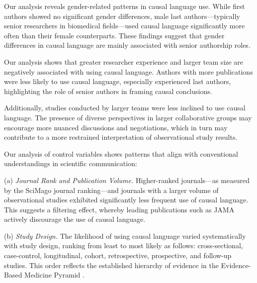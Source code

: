 Our analysis reveals gender-related patterns in causal language use.
While first authors showed no
significant gender differences, male last authors—typically senior researchers
in biomedical fields—used causal language significantly more often than
their female counterparts. These findings suggest that gender differences in
causal language are mainly associated with senior authorship roles.


Our analysis shows that greater researcher experience and larger team size are
negatively associated with using causal language. Authors with more publications
were less likely to use causal language, especially experienced last authors,
highlighting the role of senior authors in framing causal conclusions.

Additionally, studies conducted by larger teams were less inclined to use causal language.
The presence of diverse perspectives in larger collaborative groups
may encourage more nuanced discussions and negotiations, which in turn may contribute to a
more restrained interpretation of observational study results.


%
Our analysis of control variables shows patterns that align with conventional
understandings in scientific communication:

(a) {\em Journal Rank and Publication Volume.}
Higher-ranked journals—as measured by
the SciMago journal ranking—and journals with a larger volume of observational
studies exhibited significantly less frequent use of causal language. This
suggests a filtering effect, whereby leading publications such as JAMA actively
discourage the use of causal language.

(b) {\em Study Design.}
The likelihood of using causal language varied systematically
with study design, ranking from least to most likely as follows:
cross-sectional, case-control, longitudinal, cohort, retrospective, prospective,
and follow-up studies. This order reflects the established hierarchy of
evidence in the Evidence-Based Medicine Pyramid \cite{murad2016new}.

\iffalse
(c) {\em Over 700 MeSH Terms.}
Our regression model further controlled for more than
700 Medical Subject Heading (MeSH) terms, each appearing in at least 150
studies. Detailed effects of these terms on the usage of causal language are
provided in the Supplementary Information (see \ref{meshtermeffect}), offering additional insights into how
specific research topics, methods, and key concepts are tied to authors'
linguistic choices.
\fi

